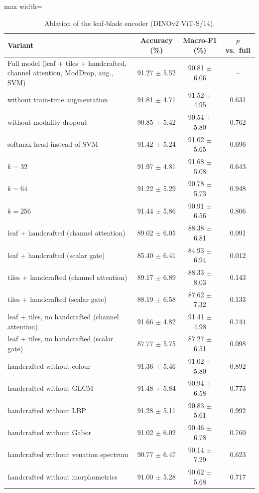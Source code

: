 \begin{table}[tbp]
\centering
\footnotesize
\caption{Ablation of the leaf-blade encoder (DINOv2 ViT-S/14).}
\label{tab:ablation}
\begin{adjustbox}{max width=\textwidth}
\begin{tabular}{lccc}
\toprule
Variant & Accuracy (\%) & Macro-F1 (\%) & $p$ vs.\ full \\
\midrule
Full model (leaf + tiles + handcrafted, channel attention, ModDrop, aug., SVM) & 91.27 $\pm$ 5.52 & 90.81 $\pm$ 6.06 & -- \\
\quad without train-time augmentation & 91.81 $\pm$ 4.71 & 91.52 $\pm$ 4.95 & 0.631 \\
\quad without modality dropout & 90.85 $\pm$ 5.42 & 90.54 $\pm$ 5.80 & 0.762 \\
\quad softmax head instead of SVM & 91.42 $\pm$ 5.24 & 91.02 $\pm$ 5.65 & 0.696 \\
\quad $k=32$ & 91.97 $\pm$ 4.81 & 91.68 $\pm$ 5.08 & 0.643 \\
\quad $k=64$ & 91.22 $\pm$ 5.29 & 90.78 $\pm$ 5.73 & 0.948 \\
\quad $k=256$ & 91.44 $\pm$ 5.86 & 90.91 $\pm$ 6.56 & 0.806 \\
\quad leaf + handcrafted (channel attention) & 89.02 $\pm$ 6.05 & 88.38 $\pm$ 6.81 & 0.091 \\
\quad leaf + handcrafted (scalar gate) & 85.40 $\pm$ 6.41 & 84.93 $\pm$ 6.94 & 0.012 \\
\quad tiles + handcrafted (channel attention) & 89.17 $\pm$ 6.89 & 88.33 $\pm$ 8.03 & 0.143 \\
\quad tiles + handcrafted (scalar gate) & 88.19 $\pm$ 6.58 & 87.62 $\pm$ 7.32 & 0.133 \\
\quad leaf + tiles, no handcrafted (channel attention) & 91.66 $\pm$ 4.82 & 91.41 $\pm$ 4.98 & 0.744 \\
\quad leaf + tiles, no handcrafted (scalar gate) & 87.77 $\pm$ 5.75 & 87.27 $\pm$ 6.51 & 0.098 \\
\quad handcrafted without colour & 91.36 $\pm$ 5.46 & 91.02 $\pm$ 5.80 & 0.892 \\
\quad handcrafted without GLCM & 91.48 $\pm$ 5.84 & 90.94 $\pm$ 6.58 & 0.773 \\
\quad handcrafted without LBP & 91.28 $\pm$ 5.11 & 90.83 $\pm$ 5.61 & 0.992 \\
\quad handcrafted without Gabor & 91.02 $\pm$ 6.02 & 90.46 $\pm$ 6.78 & 0.760 \\
\quad handcrafted without venation spectrum & 90.77 $\pm$ 6.47 & 90.14 $\pm$ 7.29 & 0.623 \\
\quad handcrafted without morphometrics & 91.00 $\pm$ 5.28 & 90.62 $\pm$ 5.68 & 0.717 \\
\bottomrule
\end{tabular}
\end{adjustbox}
\end{table}

